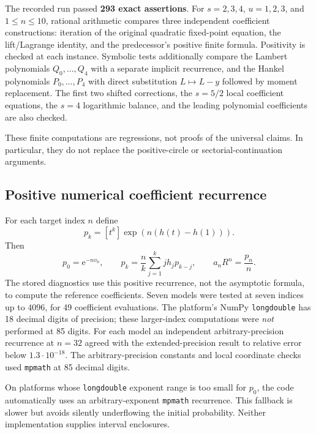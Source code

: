 \documentclass[11pt,a4paper]{article}
\theoremstyle{definition}\newtheorem{definition}[theorem]{Definition}
\theoremstyle{remark}\newtheorem{remark}[theorem]{Remark}
\newcommand{\ee}{\mathrm e}
\newcommand{\vb}{v_{\mathrm b}}
\numberwithin{equation}{section}
\begin{document}
The recorded run passed \textbf{293 exact assertions}. For
$s=2,3,4$, $u=1,2,3$, and $1\le n\le10$, rational arithmetic compares
three independent coefficient constructions: iteration of the original
quadratic fixed-point equation, the lift/Lagrange identity, and the
predecessor's positive finite formula. Positivity is checked at each
instance. Symbolic tests additionally compare the Lambert polynomials
$Q_0,\ldots,Q_4$ with a separate implicit recurrence, and the Hankel
polynomials $P_0,\ldots,P_4$ with direct substitution
$L\mapsto L-y$ followed by moment replacement. The first two shifted
corrections, the $s=5/2$ local coefficient equations, the $s=4$ logarithmic
balance, and the leading polynomial coefficients are also checked.

These finite computations are regressions, not proofs of the universal
claims. In particular, they do not replace the positive-circle or
sectorial-continuation arguments.

\subsection{Positive numerical coefficient recurrence}

For each target index $n$ define
\[
 p_k=[t^k]\exp(n(h(t)-h(1))).
\]
Then
\begin{equation}\label{qb:eq:prob-rec}
 p_0=\ee^{-n\vb},\qquad
 p_k=\frac nk\sum_{j=1}^k jh_jp_{k-j},\qquad
 a_nR^n=\frac{p_n}{n}.
\end{equation}
The stored diagnostics use this positive recurrence, not the asymptotic
formula, to compute the reference coefficients. Seven models were tested
at seven indices up to $4096$, for 49 coefficient evaluations. The
platform's NumPy \texttt{longdouble} has 18 decimal digits of precision;
these larger-index computations were \emph{not} performed at 85 digits.
For each model an independent arbitrary-precision recurrence at $n=32$
agreed with the extended-precision result to relative error below
$1.3\cdot10^{-18}$. The arbitrary-precision constants and local coordinate
checks used \texttt{mpmath} at 85 decimal digits.

On platforms whose \texttt{longdouble} exponent range is too small for
$p_0$, the code automatically uses an arbitrary-exponent \texttt{mpmath}
recurrence. This fallback is slower but avoids silently underflowing the
initial probability. Neither implementation supplies interval enclosures.
\end{document}
